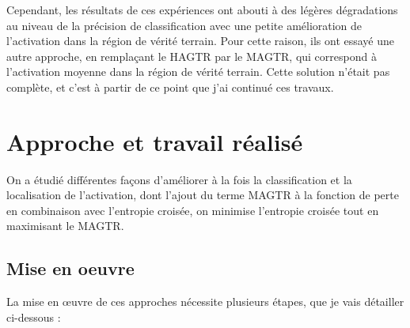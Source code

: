 \documentclass{report}
\begin{document}
{\hspace{1.6cm}Cependant, les résultats de ces expériences ont abouti à des légères dégradations au niveau de la précision de classification avec une petite amélioration de l'activation dans la région de vérité terrain. Pour cette raison, ils ont essayé une autre approche, en remplaçant le HAGTR par le MAGTR, qui correspond à l'activation moyenne dans la région de vérité terrain. Cette solution n'était pas complète, et c'est à partir de ce point que j'ai continué ces travaux.


\chapter{Approche et travail réalisé}

    \hspace{1.6cm}On a étudié différentes façons d'améliorer à la fois la classification et la localisation de l'activation, dont l'ajout du terme MAGTR à la fonction de perte en combinaison avec l'entropie croisée, on minimise l’entropie croisée tout en maximisant le MAGTR.


\section{Mise en oeuvre}
    La mise en œuvre de ces approches nécessite plusieurs étapes, que je vais détailler ci-dessous :

}
\end{document}
